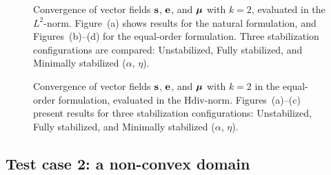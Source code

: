 \begin{figure}[h!]
	\centering
	\caption{Convergence of vector fields $\mathbf{s}$, $\mathbf{e}$, and $\boldsymbol{\mu}$ with $k=2$, evaluated in the $L^{2}$-norm. Figure~(a) shows results for the natural formulation, and Figures~(b)--(d) for the equal-order formulation. Three stabilization configurations are compared: Unstabilized, Fully stabilized, and Minimally stabilized ($\alpha$, $\eta$).}
	\def\svgwidth{1.0\columnwidth}
	
	\label{fig:convergence_vector_cubic}
\end{figure}

\begin{figure}[h!]
	\centering
	\caption{Convergence of vector fields $\mathbf{s}$, $\mathbf{e}$, and $\boldsymbol{\mu}$ with $k=2$ in the equal-order formulation, evaluated in the $\text{Hdiv}$-norm. Figures~(a)--(c) present results for three stabilization configurations: Unstabilized, Fully stabilized, and Minimally stabilized ($\alpha$, $\eta$).}
	\def\svgwidth{1.0\columnwidth}
	
	\label{fig:convergence_vector_cubic_hdiv}
\end{figure}


\cleardoublepage
\newpage
\subsection{Test case 2: a non-convex domain}\label{sec:test_case2}


